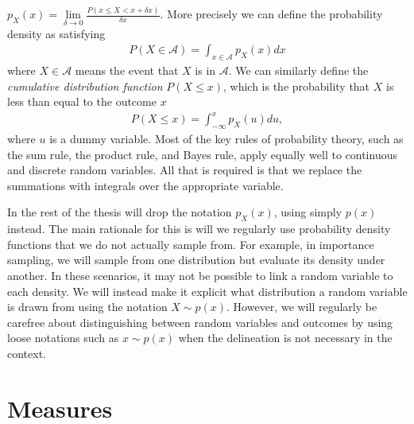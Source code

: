 $p_{X}(x) = \lim\limits_{\delta\rightarrow0} \frac{P(x\le X <x+\delta x)}{\delta x}$.  More 
precisely we can define the probability density as satisfying
\begin{align}
\label{eq:prob:density}
P(X\in \mathcal{A}) = \int_{x\in\mathcal{A}} p_{X}(x) dx
\end{align}
where $X\in \mathcal{A}$ means the event that $X$ is in $\mathcal{A}$.  We can similarly
define the \emph{cumulative distribution function} $P(X\le x)$, which is the probability
that $X$ is less than equal to the outcome $x$
\begin{align}
\label{eq:prob:cumulative}
P(X\le x) = \int_{-\infty}^{x} p_{X}(u) du,
\end{align}
where $u$ is a dummy variable.
Most of the key rules of probability theory, such as the sum rule, the product rule, and Bayes
rule, apply equally well to continuous and discrete random variables.  All that is required
is that we replace the summations with integrals over the appropriate variable. 

In the rest of the thesis will drop the notation $p_{X}(x)$, using simply $p(x)$ instead.
The main rationale for this is will we regularly use probability density functions that we do
not actually sample from.  For example, in importance sampling, we will sample from one
distribution but evaluate its density under another.  In these scenarios, it may not be possible
to link a random variable to each density.  We will instead make it explicit what distribution
a random variable is drawn from using the notation $X\sim p(x)$.  
However, we will regularly be carefree about
distinguishing between random variables and outcomes by using loose notations such as
$x\sim p(x)$ when the delineation is not necessary in the context.


\section{Measures}
\label{sec:prob:measure}

